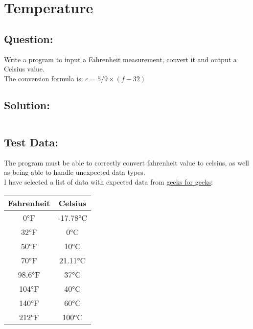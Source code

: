 \documentclass[main.tex]{subfiles}
\begin{document}
    \section{Temperature}
        \subsection*{Question:}
        Write a program to input a Fahrenheit measurement, convert it and output a Celsius value.\\
        The conversion formula is: \(c = 5 / 9 \times (f - 32)\)
            
        \subsection*{Solution:}
            \inputminted{cpp}{../02-Temperature/Temperature.cpp}

        \newpage
        \subsection*{Test Data:}
            The program must be able to correctly convert fahrenheit value to celsius,
            as well as being able to handle unexpected data types.\\

            I have selected a list of data with expected data from \href{https://www.geeksforgeeks.org/fahrenheit-to-celsius-formula/}{geeks for geeks}:
            \begin{center}
                \begin{tabular}{c c}
                    \hline
                    \textbf{Fahrenheit} & \textbf{Celsius} \\
                    \hline
                    0°F & -17.78°C \\
                    32°F & 0°C \\
                    50°F & 10°C \\
                    70°F & 21.11°C \\
                    98.6°F & 37°C \\
                    104°F & 40°C \\
                    140°F & 60°C \\
                    212°F & 100°C \\
                    \hline
                \end{tabular}
            \end{center}
\end{document}
